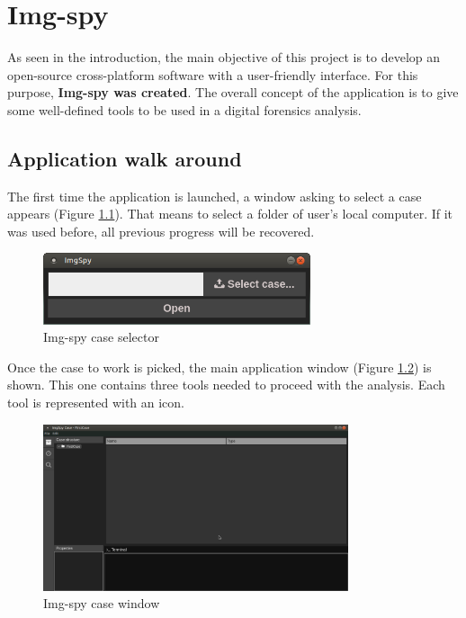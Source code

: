 \chapter{Img-spy}
\label{S:img-spy}

As seen in the introduction, the main objective of this project is to develop
an open-source cross-platform software with a user-friendly interface. For this
purpose, \textbf{Img-spy was created}. The overall concept of the application
is to give some well-defined tools to be used in a digital forensics analysis. 

\section{Application walk around}

The first time the application is launched, a window asking to select a case
appears (Figure \ref{F:img-spy-select-case}). That means to select a folder of
user's local computer. If it was used before, all previous progress will be 
recovered.

\begin{figure}[htb]
	\begin{center}
		\includegraphics[width=0.7\textwidth]{./figures/img-spy-select-case.png}
		\caption{Img-spy case selector}
		\label{F:img-spy-select-case}
	\end{center}
\end{figure}

Once the case to work is picked, the main application window (Figure
\ref{F:img-spy-case-window}) is shown. This one contains three tools needed to
proceed with the analysis. Each tool is represented with an icon.

\begin{figure}[htb]
	\begin{center}
		\includegraphics[width=0.8\textwidth]{./figures/img-spy-dark.png}
		\caption{Img-spy case window}
		\label{F:img-spy-case-window}
	\end{center}
\end{figure}


